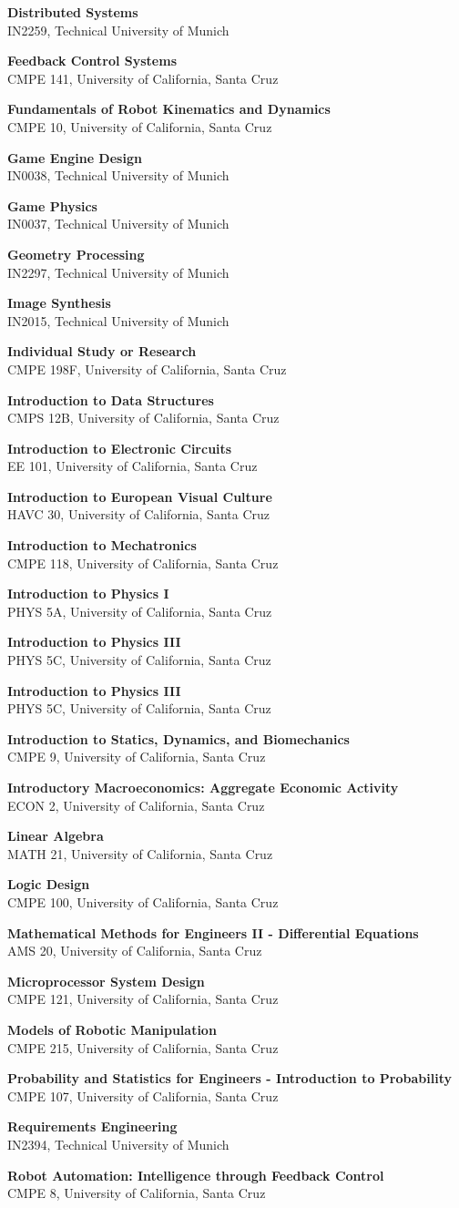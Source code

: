 \documentclass[letterpaper,11pt]{article}
\newcommand{\resumeCourse}[3]{
  \item
    \textbf{#1} \\
    {\small #2, #3} \vspace{-5pt}
}
\begin{document}
    \resumeCourse
      {Distributed Systems}{IN2259}{Technical University of Munich}
    \resumeCourse
      {Feedback Control Systems}{CMPE 141}{University of California, Santa Cruz}
    \resumeCourse
      {Fundamentals of Robot Kinematics and Dynamics}{CMPE 10}{University of California, Santa Cruz}
    \resumeCourse
      {Game Engine Design}{IN0038}{Technical University of Munich}
    \resumeCourse
      {Game Physics}{IN0037}{Technical University of Munich}
    \resumeCourse
      {Geometry Processing}{IN2297}{Technical University of Munich}
    \resumeCourse
      {Image Synthesis}{IN2015}{Technical University of Munich}
    \resumeCourse
      {Individual Study or Research}{CMPE 198F}{University of California, Santa Cruz}
    \resumeCourse
      {Introduction to Data Structures}{CMPS 12B}{University of California, Santa Cruz}
    \resumeCourse
      {Introduction to Electronic Circuits}{EE 101}{University of California, Santa Cruz}
    \resumeCourse
      {Introduction to European Visual Culture}{HAVC 30}{University of California, Santa Cruz}
    \resumeCourse
      {Introduction to Mechatronics}{CMPE 118}{University of California, Santa Cruz}
    \resumeCourse
      {Introduction to Physics I}{PHYS 5A}{University of California, Santa Cruz}
    \resumeCourse
      {Introduction to Physics III}{PHYS 5C}{University of California, Santa Cruz}
    \resumeCourse
      {Introduction to Physics III}{PHYS 5C}{University of California, Santa Cruz}
    \resumeCourse
      {Introduction to Statics, Dynamics, and Biomechanics}{CMPE 9}{University of California, Santa Cruz}
    \resumeCourse
      {Introductory Macroeconomics: Aggregate Economic Activity}{ECON 2}{University of California, Santa Cruz}
    \resumeCourse
      {Linear Algebra}{MATH 21}{University of California, Santa Cruz}
    \resumeCourse
      {Logic Design}{CMPE 100}{University of California, Santa Cruz}
    \resumeCourse
      {Mathematical Methods for Engineers II - Differential Equations}{AMS 20}{University of California, Santa Cruz}
    \resumeCourse
      {Microprocessor System Design}{CMPE 121}{University of California, Santa Cruz}
    \resumeCourse
      {Models of Robotic Manipulation}{CMPE 215}{University of California, Santa Cruz}
    \resumeCourse
      {Probability and Statistics for Engineers - Introduction to Probability}{CMPE 107}{University of California, Santa Cruz}
    \resumeCourse
      {Requirements Engineering}{IN2394}{Technical University of Munich}
    \resumeCourse
      {Robot Automation: Intelligence through Feedback Control}{CMPE 8}{University of California, Santa Cruz}
\end{document}

